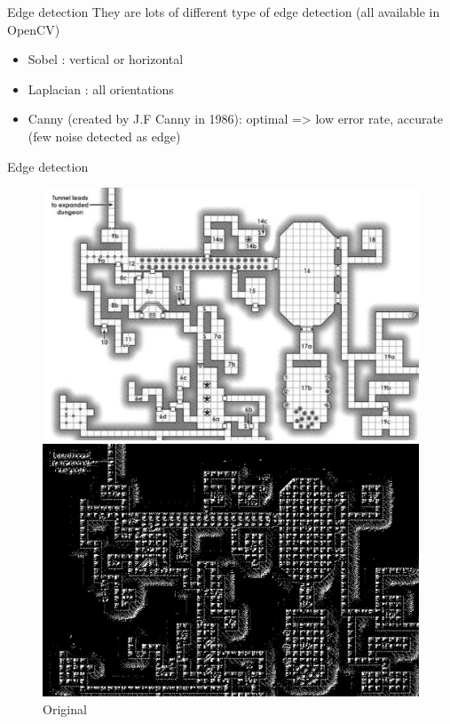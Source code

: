 \documentclass[tikz,table,border=2mm]{beamer}
\begin{document}
\begin{frame}{Edge detection}
They are lots of different type of edge detection (all available in OpenCV)
\begin{itemize}
	\item Sobel : vertical or horizontal
	\item Laplacian : all orientations
	\item Canny (created by J.F Canny in 1986): optimal => low error rate, accurate (few noise detected as edge)
\end{itemize}
\end{frame}
\begin{frame}{Edge detection}
    \begin{figure}[ht]
        \begin{minipage}[b]{0.35\linewidth}
            \centering
            \includegraphics[width=\textwidth]{images/dungeon.png}
            \caption{Original}
            \label{fig:a}
        \end{minipage}
        \hspace{0.5cm}
        \begin{minipage}[b]{0.35\linewidth}
            \centering
            \includegraphics[width=\textwidth]{images/sobel_OR.jpg}

\end{minipage}
\end{figure}
\end{frame}
\end{document}
